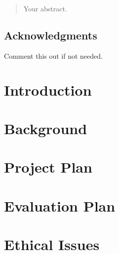 \documentclass[12pt,twoside]{report}
\begin{document}



\clearpage{\pagestyle{empty}\cleardoublepage}
\setcounter{page}{1}
\pagestyle{fancy}

\begin{abstract}
    Your abstract.
\end{abstract}

\cleardoublepage
\section*{Acknowledgments}
Comment this out if not needed.

\clearpage{\pagestyle{empty}\cleardoublepage}

\tableofcontents


\clearpage{\pagestyle{empty}\cleardoublepage}
\setcounter{page}{1}
\fancyhead[LE,RO]{\slshape \rightmark}
\fancyhead[LO,RE]{\slshape \leftmark}

\chapter{Introduction}


\chapter{Background}



\chapter{Project Plan}


\chapter{Evaluation Plan}


\chapter{Ethical Issues}

\printbibliography
\end{document}
